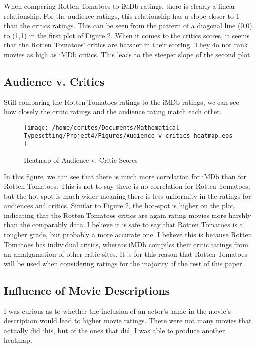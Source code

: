 \documentclass[10pt]{article}
\begin{document}
When comparing Rotten Tomatoes to iMDb ratings, there is clearly a linear relationship. For the audience ratings, this relationship has a slope closer to 1 than the critics ratings. This can be seen from the pattern of a diagonal line (0,0) to (1,1) in the first plot of Figure 2. When it comes to the critics scores, it seems that the Rotten Tomatoes' critics are harsher in their scoring. They do not rank movies as high as iMDb critics. This leads to the steeper slope of the second plot. \\ 

\subsection*{Audience v. Critics}
\par  Still comparing the Rotten Tomatoes ratings to the iMDb ratings, we can see how closely the critic ratings and the audience rating match each other. \\ 

\begin{wrapfigure}{r}{0.55\linewidth}
\texttt{[image: /home/ccrites/Documents/Mathematical Typesetting/Project4/Figures/Audience\_v\_critics\_heatmap.eps]}
\caption{\label{fig3} Heatmap of Audience v. Critic Scores}
\end{wrapfigure}
In this figure, we can see that there is much more correlation for iMDb than for Rotten Tomatoes. This is not to say there is no correlation for Rotten Tomatoes, but the hot-spot is much wider meaning there is less uniformity in the ratings for audiences and critics. Similar to Figure 2, the hot-spot is higher on the plot, indicating that the Rotten Tomatoes critics are again rating movies more harshly than the comparably data. I believe it is safe to say that Rotten Tomatoes is a tougher grade, but probably a more accurate one. I believe this is because Rotten Tomatoes has individual critics, whereas iMDb compiles their critic ratings from  an amalgamation of other critic sites. It is for this reason that Rotten Tomatoes will be used when considering ratings for the majority of the rest of this paper. \\

\subsection*{Influence of Movie Descriptions}
\par I was curious as to whether the inclusion of an actor's name in the movie's description would lead to higher movie ratings. There were not many movies that actually did this, but of the ones that did, I was able to produce another heatmap. \\
\end{document}
